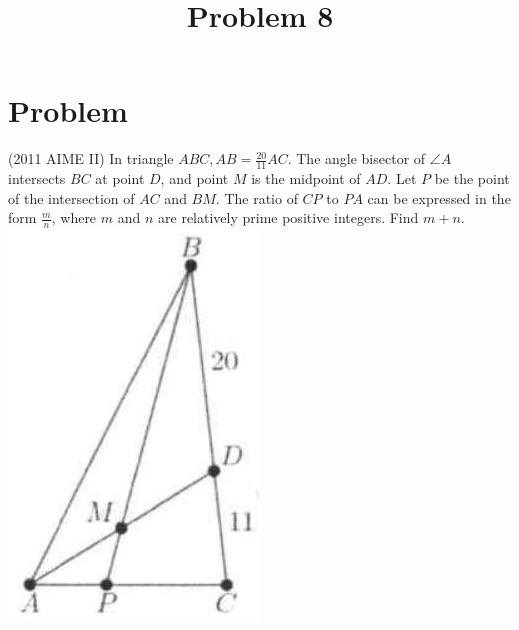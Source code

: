 \documentclass{article}
\title{Problem 8}
\date{}
\begin{document}
\maketitle

\section*{Problem}
(2011 AIME II) In triangle \(A B C, A B=\frac{20}{11} A C\). The angle bisector of \(\angle A\) intersects \(B C\) at point \(D\), and point \(M\) is the midpoint of \(A D\). Let \(P\) be the point of the intersection of \(A C\) and \(B M\). The ratio of \(C P\) to \(P A\) can be expressed in the form \(\frac{m}{n}\), where \(m\) and \(n\) are relatively prime positive integers. Find \(m+n\).\\
\centering
\includegraphics[width=\textwidth]{images/problem_image_1.jpg}
\end{document}
